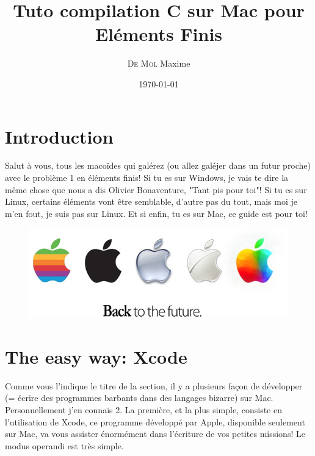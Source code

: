 \documentclass[11pt,a4paper]{article}
\author{\textsc{De Mol} Maxime}
\title{Tuto compilation C sur Mac pour Eléments Finis}
\date{\today}
\begin{document}
\maketitle

\section{Introduction}

Salut à vous, tous les macoïdes qui galérez (ou allez galéjer dans un futur proche) avec le problème 1 en éléments finis! Si tu es sur Windows, je vais te dire la même chose que nous a dis Olivier Bonaventure, "Tant pis pour toi"! Si tu es sur Linux, certains éléments vont être semblable, d'autre pas du tout, mais moi je m'en fout, je suis pas sur Linux. Et si enfin, tu es sur Mac, ce guide est pour toi!

\begin{figure}[H]
\includegraphics[width=\linewidth]{nouveau-logo-apple.jpg}
\end{figure}

\section{The easy way: Xcode}

Comme vous l'indique le titre de la section, il y a plusieurs façon de développer (= écrire des programmes barbants dans des langages bizarre) sur Mac. Personnellement j'en connais 2. La première, et la plus simple, consiste en l'utilisation de Xcode, ce programme développé par Apple, disponible seulement sur Mac, va vous assister énormément dans l'écriture de vos petites missions! Le modus operandi est très simple.
\end{document}
